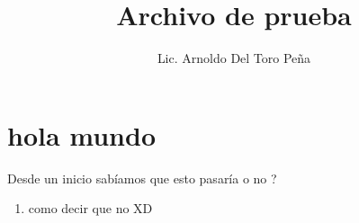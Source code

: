 \documentclass[12pt,a4paper]{article}
\title{Archivo de prueba}
\author{Lic. Arnoldo Del Toro Peña}
\begin{document}
	\maketitle
	\section{hola mundo}
	Desde un inicio sabíamos que esto pasaría o no ? 
	\begin{enumerate}
		\item como decir que no XD
	\end{enumerate}
\end{document}

